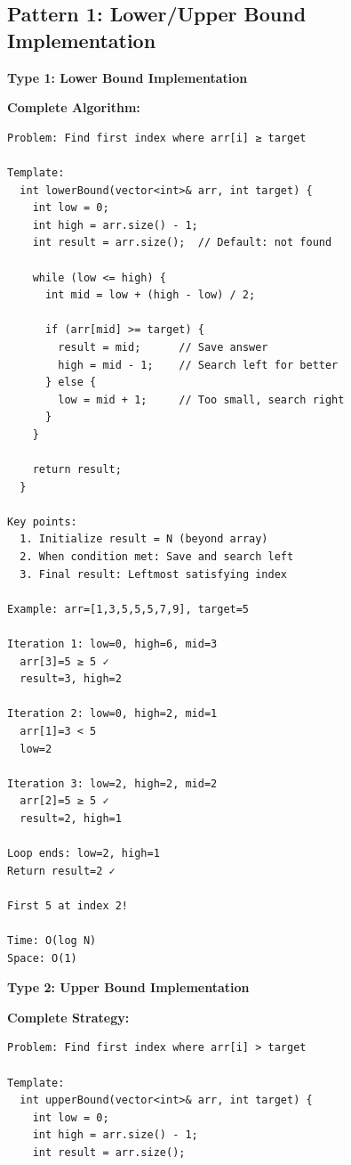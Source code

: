 \documentclass[11pt,a4paper,oneside]{book}
\begin{document}
\subsection{Pattern 1: Lower/Upper Bound Implementation}

\begin{tcolorbox}[
    enhanced,breakable,
    colback=successgreen!10,
    colframe=successgreen,
    boxrule=1.5pt,
    arc=3mm,
    title=\textbf{Complete Boundary Algorithms}
]
\textbf{Type 1: Lower Bound Implementation}

\textbf{Complete Algorithm:}
\begin{verbatim}
Problem: Find first index where arr[i] ≥ target

Template:
  int lowerBound(vector<int>& arr, int target) {
    int low = 0;
    int high = arr.size() - 1;
    int result = arr.size();  // Default: not found
    
    while (low <= high) {
      int mid = low + (high - low) / 2;
      
      if (arr[mid] >= target) {
        result = mid;      // Save answer
        high = mid - 1;    // Search left for better
      } else {
        low = mid + 1;     // Too small, search right
      }
    }
    
    return result;
  }

Key points:
  1. Initialize result = N (beyond array)
  2. When condition met: Save and search left
  3. Final result: Leftmost satisfying index

Example: arr=[1,3,5,5,5,7,9], target=5

Iteration 1: low=0, high=6, mid=3
  arr[3]=5 ≥ 5 ✓
  result=3, high=2

Iteration 2: low=0, high=2, mid=1
  arr[1]=3 < 5
  low=2

Iteration 3: low=2, high=2, mid=2
  arr[2]=5 ≥ 5 ✓
  result=2, high=1

Loop ends: low=2, high=1
Return result=2 ✓

First 5 at index 2!

Time: O(log N)
Space: O(1)
\end{verbatim}

\textbf{Type 2: Upper Bound Implementation}

\textbf{Complete Strategy:}
\begin{verbatim}
Problem: Find first index where arr[i] > target

Template:
  int upperBound(vector<int>& arr, int target) {
    int low = 0;
    int high = arr.size() - 1;
    int result = arr.size();
    

\end{verbatim}
\end{tcolorbox}
\end{document}
